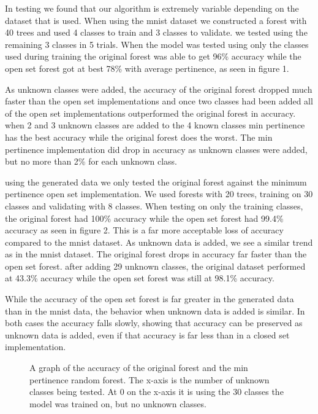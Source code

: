 \documentclass[conference]{IEEEtran}
\begin{document}
In testing we found that our algorithm is extremely variable depending on the dataset that is used.  When using the mnist dataset we constructed a forest with 40 trees and used 4 classes to train and 3 classes to validate.  we tested using the remaining 3 classes in 5 trials.  When the model was tested using only the classes used during training the original forest was able to get 96\% accuracy while the open set forest got at best 78\% with average pertinence, as seen in figure 1.  

As unknown classes were added, the accuracy of the original forest dropped much faster than the open set implementations and once two classes had been added all of the open set implementations outperformed the original forest in accuracy.  when 2 and 3 unknown classes are added to the 4 known classes min pertinence has the best accuracy while the original forest does the worst.  The min pertinence implementation did drop in accuracy as unknown classes were added, but no more than 2\% for each unknown class.

using the generated data we only tested the original forest against the minimum pertinence open set implementation.  We used forests with 20 trees, training on 30 classes and validating with 8 classes.  When testing on only the training classes, the original forest had 100\% accuracy while the open set forest had 99.4\% accuracy as seen in figure 2.  This is a far more acceptable loss of accuracy compared to the mnist dataset.  As unknown data is added, we see a similar trend as in the mnist dataset.  The original forest drops in accuracy far faster than the open set forest.  after adding 29 unknown classes, the original dataset performed at 43.3\% accuracy while the open set forest was still at 98.1\% accuracy.  

While the accuracy of the open set forest is far greater in the generated data than in the mnist data, the behavior when unknown data is added is similar.  In both cases the accuracy falls slowly, showing that accuracy can be preserved as unknown data is added,  even if that accuracy is far less than in a closed set implementation.   

\begin{figure}
\caption{A graph of the accuracy of the original forest and the min pertinence random forest.  The x-axis is the number of unknown classes being tested.  At 0 on the x-axis it is using the 30 classes the model was trained on, but no unknown classes.} 
\end{figure}
\end{document}
